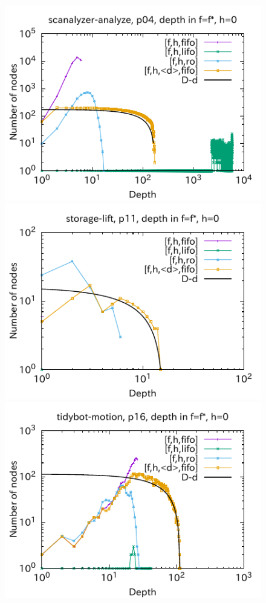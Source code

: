 \begin{figure}[htbp]
\includegraphics{img/output-lmcut/scanalyzer-analyze/p04-0.pdf}
\includegraphics{img/output-lmcut/storage-lift/p11-0.pdf}
\includegraphics{img/output-lmcut/tidybot-motion/p16-0.pdf}

\end{figure}
